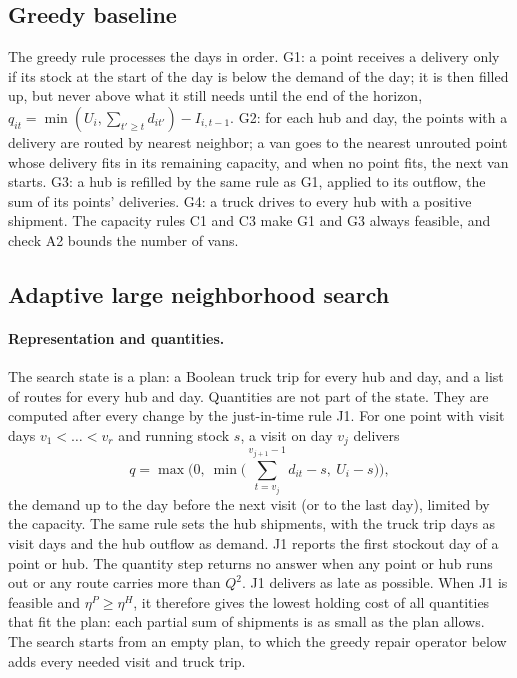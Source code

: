 \documentclass[11pt,a4paper]{article}
\begin{document}
\subsection{Greedy baseline}\label{sec:greedy}
The greedy rule processes the days in order. G1: a point receives a delivery only if its stock at
the start of the day is below the demand of the day; it is then filled up, but never above what it
still needs until the end of the horizon, $q_{it} = \min(U_i, \sum_{t' \ge t} d_{it'}) - I_{i,t-1}$.
G2: for each hub and day, the points with a delivery are routed by nearest neighbor; a van goes to
the nearest unrouted point whose delivery fits in its remaining capacity, and when no point fits,
the next van starts. G3: a hub is refilled by the same rule as G1, applied to its outflow, the sum of
its points' deliveries. G4: a truck drives to every hub with a positive shipment. The capacity
rules C1 and C3 make G1 and G3 always feasible, and check A2 bounds the number of vans.

\subsection{Adaptive large neighborhood search}\label{sec:alns}

\paragraph{Representation and quantities.}
The search state is a plan: a Boolean truck trip for every hub and day, and a list of routes for
every hub and day. Quantities are not part of the state. They are computed after every change by
the just-in-time rule J1. For one point with visit days $v_1 < \dots < v_r$ and running stock $s$,
a visit on day $v_j$ delivers
\begin{equation}
q = \max\Big(0,\ \min\big(\textstyle\sum_{t=v_j}^{v_{j+1}-1} d_{it} - s,\ U_i - s\big)\Big),
\label{eq:jit}
\end{equation}
the demand up to the day before the next visit (or to the last day), limited by the capacity. The
same rule sets the hub shipments, with the truck trip days as visit days and the hub outflow as
demand. J1 reports the first stockout day of a point or hub. The quantity step returns no answer
when any point or hub runs out or any route carries more than $Q^2$. J1 delivers as late as
possible. When J1 is feasible and $\eta^P \ge \eta^H$, it therefore gives the lowest holding cost
of all quantities that fit the plan: each partial sum of shipments is as small as the plan allows. The search starts from an empty
plan, to which the greedy repair operator below adds every needed visit and truck trip.
\end{document}
